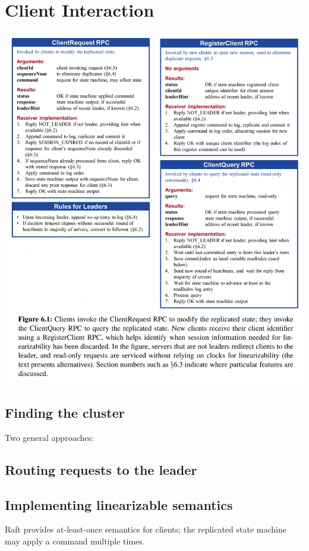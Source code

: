 \documentclass[11pt]{article}
\begin{document}
\section{Client Interaction}
\label{sec:orgc6fa17a}
\begin{center}
\includegraphics[width=.99\textwidth]{../../images/papers/21.png}
\label{}
\end{center}
\subsection{Finding the cluster}
\label{sec:org49ffd5f}
Two general approaches:
\subsection{Routing requests to the leader}
\label{sec:org26b18ae}
\subsection{Implementing linearizable semantics}
\label{sec:org0a3791d}
Raft provides at-least-once semantics for clients; the replicated state machine may apply a command
multiple times.
\end{document}
